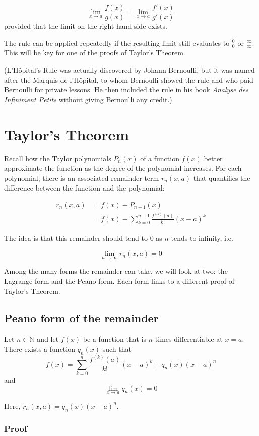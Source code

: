 \documentclass{article}
\begin{document}
$$
\lim_{x \to a} \frac{f(x)}{g(x)} = \lim_{x \to a} \frac{f'(x)}{g'(x)}
$$
provided that the limit on the right hand side exists.

The rule can be applied repeatedly if the resulting limit still evaluates to $\frac{0}{0}$ or $\frac{\infty}{\infty}$. This will be key for one of the proofs of Taylor's Theorem.

(L'Hôpital's Rule was actually discovered by Johann Bernoulli, but it was named after the Marquis de l'Hôpital, to whom Bernoulli showed the rule and who paid Bernoulli for private lessons. He then included the rule in his book \textit{Analyse des Infiniment Petits} without giving Bernoulli any credit.)

\newpage
\section*{Taylor's Theorem}

Recall how the Taylor polynomials $P_n(x)$ of a function $f(x)$ better approximate the function as the degree of the polynomial increases. For each polynomial, there is an associated remainder term $r_n(x,a)$ that quantifies the difference between the function and the polynomial:

\begin{align*}
r_n(x,a) &= f(x) - P_{n-1}(x) \\
         &= f(x) - \sum_{k=0}^{n-1} \frac{f^{(k)}(a)}{k!} (x-a)^k
\end{align*}

The idea is that this remainder should tend to 0 as $n$ tends to infinity, i.e.

$$
\lim_{n \to \infty} r_n(x,a) = 0
$$

Among the many forms the remainder can take, we will look at two: the Lagrange form and the Peano form. Each form links to a different proof of Taylor's Theorem.

\subsection*{Peano form of the remainder}

Let $n \in \mathbb{N}$ and let $f(x)$ be a function that is $n$ times differentiable at $x=a$. There exists a function $q_n(x)$ such that
$$
f(x) = \sum_{k=0}^{n} \frac{f^{(k)}(a)}{k!} (x-a)^k + q_n(x) (x-a)^n
$$
and
$$
\lim_{x \to a} q_n(x) = 0
$$

Here, $r_n(x,a) = q_n(x) (x-a)^n$.

\subsubsection*{Proof}
\end{document}
